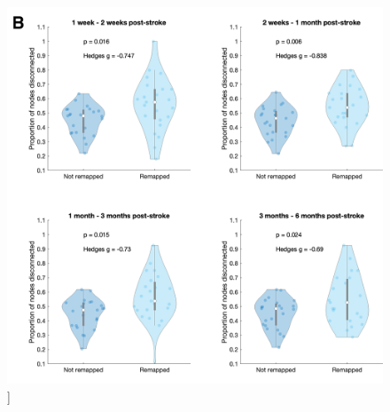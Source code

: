 \documentclass[phd,tocprelim]{cornell}
\renewcommand{\caption}[1]{\singlespacing\hangcaption{#1}\normalspacing}
\begin{document}
\begin{figure}[h!]
		\ContinuedFloat
		\captionsetup{labelformat=adja-page}
    \centering
    \includegraphics[width=\textwidth]{chapter1/SupplementaryFigure5B.png}
    \caption[]{}
\end{figure}
\null
\vfill
\clearpage
\end{document}
